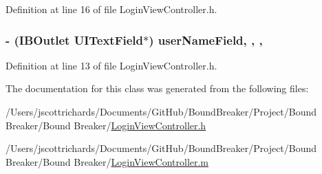 Definition at line 16 of file Login\+View\+Controller.\+h.

\hypertarget{interface_login_view_controller_a7a4a67075fd3a3c5f862ab4e50ba5b82}{}
\subsubsection[{user\+Name\+Field}]{\setlength{\rightskip}{0pt plus 5cm}-\/ (I\+B\+Outlet U\+I\+Text\+Field$\ast$) user\+Name\+Field\hspace{0.3cm}{\ttfamily [read]}, {\ttfamily [write]}, {\ttfamily [nonatomic]}, {\ttfamily [weak]}}\label{interface_login_view_controller_a7a4a67075fd3a3c5f862ab4e50ba5b82}


Definition at line 13 of file Login\+View\+Controller.\+h.



The documentation for this class was generated from the following files\+:\begin{DoxyCompactItemize}
\item 
/\+Users/jscottrichards/\+Documents/\+Git\+Hub/\+Bound\+Breaker/\+Project/\+Bound Breaker/\+Bound Breaker/\hyperlink{_login_view_controller_8h}{Login\+View\+Controller.\+h}\item 
/\+Users/jscottrichards/\+Documents/\+Git\+Hub/\+Bound\+Breaker/\+Project/\+Bound Breaker/\+Bound Breaker/\hyperlink{_login_view_controller_8m}{Login\+View\+Controller.\+m}\end{DoxyCompactItemize}
